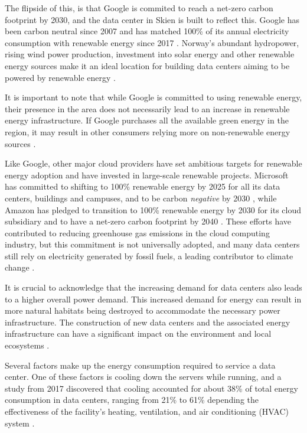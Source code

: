 \documentclass[
  table]{report}
\begin{document}
The flipside of this, is that Google is commited to reach a net-zero
carbon footprint by 2030, and the data center in Skien is built to
reflect this. Google has been carbon neutral since 2007 and has matched
100\% of its annual electricity consumption with renewable energy since
2017 \citep{googleTrackingOurCarbonFree}. Norway's abundant hydropower,
rising wind power production, investment into solar energy and other
renewable energy sources make it an ideal location for building data
centers aiming to be powered by renewable energy
\citep{norwegian-energyElectricityProduction2023}.

It is important to note that while Google is committed to using
renewable energy, their presence in the area does not necessarily lead
to an increase in renewable energy infrastructure. If Google purchases
all the available green energy in the region, it may result in other
consumers relying more on non-renewable energy sources
\citep{sundtConsumersWillingnessPay2015}.

Like Google, other major cloud providers have set ambitious targets for
renewable energy adoption and have invested in large-scale renewable
projects. Microsoft has committed to shifting to 100\% renewable energy
by 2025 for all its data centers, buildings and campuses, and to be
carbon \emph{negative} by 2030 \citep{smithMicrosoftWillBe2020}, while
Amazon has pledged to transition to 100\% renewable energy by 2030 for
its cloud subsidiary and to have a net-zero carbon footprint by 2040
\citep{amazonClimatePledge2019}. These efforts have contributed to
reducing greenhouse gas emissions in the cloud computing industry, but
this commitment is not universally adopted, and many data centers still
rely on electricity generated by fossil fuels, a leading contributor to
climate change \citep{mytton2020}.

It is crucial to acknowledge that the increasing demand for data centers
also leads to a higher overall power demand. This increased demand for
energy can result in more natural habitats being destroyed to
accommodate the necessary power infrastructure. The construction of new
data centers and the associated energy infrastructure can have a
significant impact on the environment and local ecosystems
\citep{bolognaDeforestationWorldPopulation2020}.

Several factors make up the energy consumption required to service a
data center. One of these factors is cooling down the servers while
running, and a study from 2017 discovered that cooling accounted for
about 38\% of total energy consumption in data centers, ranging from
21\% to 61\% depending the effectiveness of the facility's heating,
ventilation, and air conditioning (HVAC) system
\citep{niReviewAirConditioning2017}.
\end{document}
